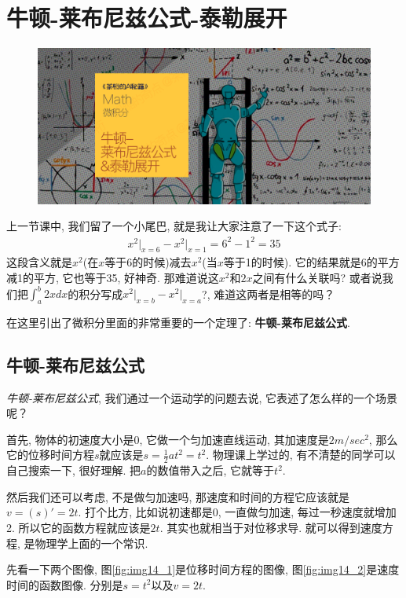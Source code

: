 \chapter{牛顿-莱布尼兹公式-泰勒展开}
\begin{figure}[ht]
  \centering
  \includegraphics[width=1\linewidth]{asset/20230904190800.png}
\end{figure}
\newpage

上一节课中, 我们留了一个小尾巴, 就是我让大家注意了一下这个式子: 
\begin{align*}
  x^2\vert _{x=6}-x^2 \vert _{x=1}=6^2 - 1^2 = 35
\end{align*}
这段含义就是$x^2$(在$x$等于6的时候)减去$x^2$(当$x$等于1的时候). 它的结果就是6的平方减1的平方, 它也等于35, 好神奇. 那难道说这$x^2$和$2x$之间有什么关联吗? 或者说我们把$\int_a^b2xdx$的积分写成$x^2\vert_{x=b}-x^2 \vert_{x=a}$?, 难道这两者是相等的吗？

在这里引出了微积分里面的非常重要的一个定理了: \textbf{牛顿-莱布尼兹公式}. 

\section{牛顿-莱布尼兹公式}

\textit{牛顿-莱布尼兹公式}, 我们通过一个运动学的问题去说, 它表述了怎么样的一个场景呢？

首先, 物体的初速度大小是0, 它做一个匀加速直线运动, 其加速度是$2m/sec^2$, 那么它的位移时间方程$s$就应该是$s=\frac{1}{2}at^2 = t^2$. 物理课上学过的, 有不清楚的同学可以自己搜索一下, 很好理解. 把$a$的数值带入之后, 它就等于$t^2$. 

然后我们还可以考虑, 不是做匀加速吗, 那速度和时间的方程它应该就是$ v = (s)' = 2t$. 打个比方, 比如说初速都是0, 一直做匀加速, 每过一秒速度就增加2. 所以它的函数方程就应该是$2t$. 其实也就相当于对位移求导. 就可以得到速度方程, 是物理学上面的一个常识. 

先看一下两个图像, 图\ref{fig:img14_1}是位移时间方程的图像, 图\ref{fig:img14_2}是速度时间的函数图像. 分别是$s=t^2$以及$v=2t$. 

